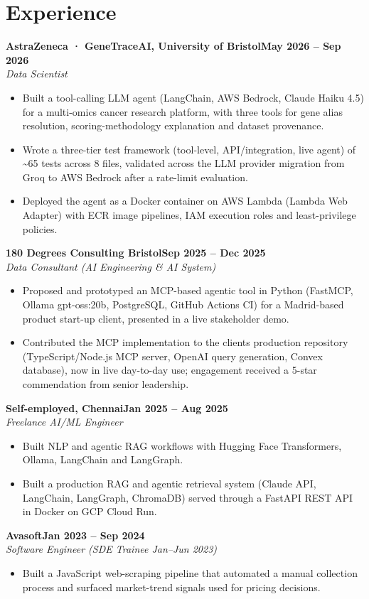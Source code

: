 \documentclass[a4paper,10pt]{article}
\newcommand{\entry}[4]{\noindent\textbf{#1}\hfill\textbf{#2}\\ \textit{#3}\hfill\textit{#4}\par}
\begin{document}
\section{Experience}
\entry{AstraZeneca · GeneTraceAI, University of Bristol}{May 2026 – Sep 2026}{Data Scientist}{}
\begin{itemize}
  \item Built a tool-calling LLM agent (LangChain, AWS Bedrock, Claude Haiku 4.5) for a multi-omics cancer research platform, with three tools for gene alias resolution, scoring-methodology explanation and dataset provenance.
  \item Wrote a three-tier test framework (tool-level, API/integration, live agent) of \textasciitilde{}65 tests across 8 files, validated across the LLM provider migration from Groq to AWS Bedrock after a rate-limit evaluation.
  \item Deployed the agent as a Docker container on AWS Lambda (Lambda Web Adapter) with ECR image pipelines, IAM execution roles and least-privilege policies.
\end{itemize}
\vspace{3pt}
\entry{180 Degrees Consulting Bristol}{Sep 2025 – Dec 2025}{Data Consultant (AI Engineering \& AI System)}{}
\begin{itemize}
  \item Proposed and prototyped an MCP-based agentic tool in Python (FastMCP, Ollama gpt-oss:20b, PostgreSQL, GitHub Actions CI) for a Madrid-based product start-up client, presented in a live stakeholder demo.
  \item Contributed the MCP implementation to the client\textquotesingle{}s production repository (TypeScript/Node.js MCP server, OpenAI query generation, Convex database), now in live day-to-day use; engagement received a 5-star commendation from senior leadership.
\end{itemize}
\vspace{3pt}
\entry{Self-employed, Chennai}{Jan 2025 – Aug 2025}{Freelance AI/ML Engineer}{}
\begin{itemize}
  \item Built NLP and agentic RAG workflows with Hugging Face Transformers, Ollama, LangChain and LangGraph.
  \item Built a production RAG and agentic retrieval system (Claude API, LangChain, LangGraph, ChromaDB) served through a FastAPI REST API in Docker on GCP Cloud Run.
\end{itemize}
\vspace{3pt}
\entry{Avasoft}{Jan 2023 – Sep 2024}{Software Engineer (SDE Trainee Jan–Jun 2023)}{}
\begin{itemize}
  \item Built a JavaScript web-scraping pipeline that automated a manual collection process and surfaced market-trend signals used for pricing decisions.
\end{itemize}
\end{document}
